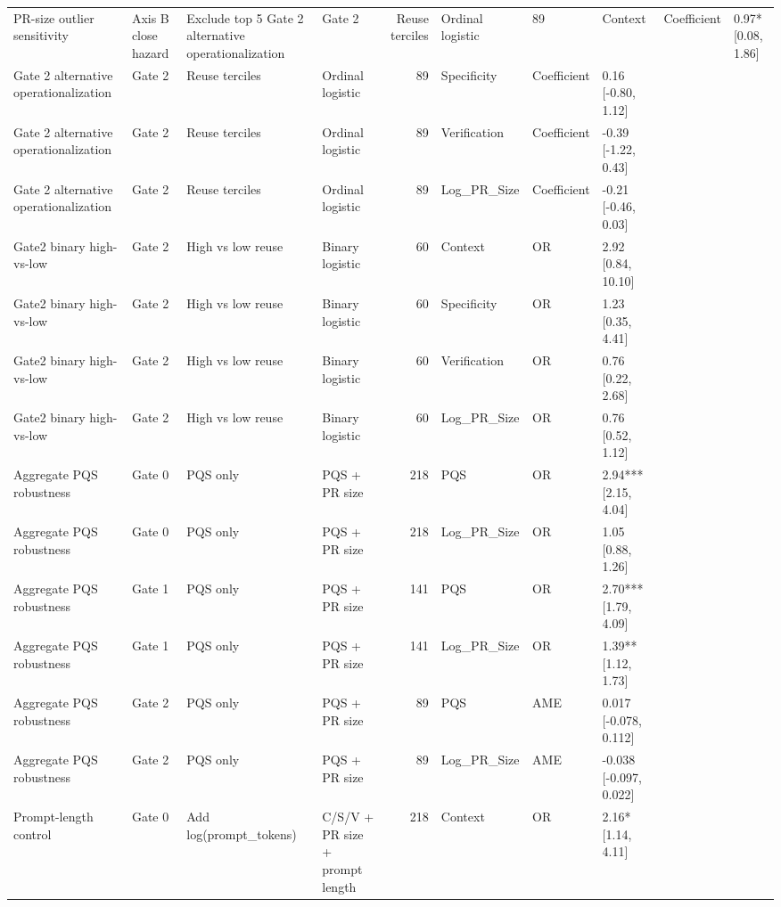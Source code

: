 \begin{table}
\begin{tabular}{llllrlll}
PR-size outlier sensitivity & Axis B close hazard & Exclude top 5%
Gate 2 alternative operationalization & Gate 2 & Reuse terciles & Ordinal logistic & 89 & Context & Coefficient & 0.97* [0.08, 1.86] \\
Gate 2 alternative operationalization & Gate 2 & Reuse terciles & Ordinal logistic & 89 & Specificity & Coefficient & 0.16 [-0.80, 1.12] \\
Gate 2 alternative operationalization & Gate 2 & Reuse terciles & Ordinal logistic & 89 & Verification & Coefficient & -0.39 [-1.22, 0.43] \\
Gate 2 alternative operationalization & Gate 2 & Reuse terciles & Ordinal logistic & 89 & Log_PR_Size & Coefficient & -0.21 [-0.46, 0.03] \\
Gate2 binary high-vs-low & Gate 2 & High vs low reuse & Binary logistic & 60 & Context & OR & 2.92 [0.84, 10.10] \\
Gate2 binary high-vs-low & Gate 2 & High vs low reuse & Binary logistic & 60 & Specificity & OR & 1.23 [0.35, 4.41] \\
Gate2 binary high-vs-low & Gate 2 & High vs low reuse & Binary logistic & 60 & Verification & OR & 0.76 [0.22, 2.68] \\
Gate2 binary high-vs-low & Gate 2 & High vs low reuse & Binary logistic & 60 & Log_PR_Size & OR & 0.76 [0.52, 1.12] \\
Aggregate PQS robustness & Gate 0 & PQS only & PQS + PR size & 218 & PQS & OR & 2.94*** [2.15, 4.04] \\
Aggregate PQS robustness & Gate 0 & PQS only & PQS + PR size & 218 & Log_PR_Size & OR & 1.05 [0.88, 1.26] \\
Aggregate PQS robustness & Gate 1 & PQS only & PQS + PR size & 141 & PQS & OR & 2.70*** [1.79, 4.09] \\
Aggregate PQS robustness & Gate 1 & PQS only & PQS + PR size & 141 & Log_PR_Size & OR & 1.39** [1.12, 1.73] \\
Aggregate PQS robustness & Gate 2 & PQS only & PQS + PR size & 89 & PQS & AME & 0.017 [-0.078, 0.112] \\
Aggregate PQS robustness & Gate 2 & PQS only & PQS + PR size & 89 & Log_PR_Size & AME & -0.038 [-0.097, 0.022] \\
Prompt-length control & Gate 0 & Add log(prompt_tokens) & C/S/V + PR size + prompt length & 218 & Context & OR & 2.16* [1.14, 4.11] \\

\end{tabular}
\end{table}
